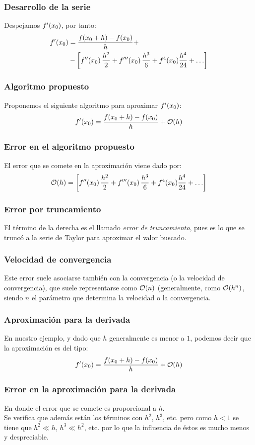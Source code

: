 \documentclass[12pt]{beamer}
\begin{document}
\begin{frame}
\frametitle{Desarrollo de la serie}
Despejamos ${f}^{\prime} (x_{0})$, por tanto:
\pause
\begin{align*}
{f}^{\prime} (x_{0}) &= \dfrac{f (x_{0} + h) - f (x_{0})}{h} + \\
&- \left[ {f}^{\prime \prime} (x_{0}) \, \dfrac{h^{2}}{2} + {f}^{\prime \prime \prime} (x_{0}) \, \dfrac{h^{3}}{6} + f^{4}(x_{0}) \dfrac{h^{4}}{24} + \ldots \right] 
\end{align*}
\end{frame}
\begin{frame}
\frametitle{Algoritmo propuesto}
Proponemos el siguiente algoritmo para aproximar ${f}^{\prime} (x_{0})$:
\pause
\begin{align*}
\pderivada{f} (x_{0}) = \dfrac{f (x_{0} + h) - f (x_{0})}{h} + \order{h}
\end{align*}
\end{frame}
\begin{frame}
\frametitle{Error en el algoritmo propuesto}
El error que se comete en la aproximación viene dado por:
\pause
\begin{align*}
\order{h} = \left[  \sderivada{f} (x_{0}) \, \dfrac{h^{2}}{2} + \tderivada{f} (x_{0}) \, \dfrac{h^{3}}{6} + f^{4}(x_{0}) \dfrac{h^{4}}{24} + \ldots \right] 
\end{align*}
\end{frame}
\begin{frame}
\frametitle{Error por truncamiento}
El término de la derecha es el llamado \emph{error de truncamiento}, pues es lo que se truncó a la serie de Taylor para aproximar el valor buscado. 
\end{frame}
\begin{frame}
\frametitle{Velocidad de convergencia}
Este error suele asociarse también con la convergencia (o la velocidad de convergencia), que suele representarse como $\order{n}$ (generalmente, como $\order{h^{n}}$, siendo $n$ el parámetro que determina la velocidad o la convergencia. 
\end{frame}
\begin{frame}
\frametitle{Aproximación para la derivada}
En nuestro ejemplo, y dado que $h$ generalmente es menor a $1$, podemos decir que la aproximación es del tipo:
\pause
\begin{align*}
\pderivada{f} (x_{0}) = \dfrac{f (x_{0} + h) - f (x_{0})}{h} +  \order{h}
\end{align*}
\end{frame}
\begin{frame}
\frametitle{Error en la aproximación para la derivada}
En donde el error que se comete es proporcional a $h$.
\\
\medskip
\pause
Se verifica que además están los términos con $h^{2}$, $h^{3}$, etc. pero como $h < 1$ se tiene que $h^{2} \ll h$, $h^{3} \ll h^{2}$, etc. por lo que la influencia de éstos es mucho menos y despreciable.
\end{frame}
\end{document}
